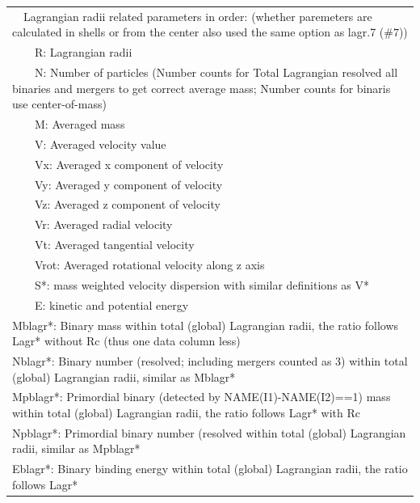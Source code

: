 \begin{longtable}{||p{0.42in}|p{0.25in}|p{0.6in}|p{0.6in}|p{0.4in}|p{2.3in}||}
\multicolumn{6}{|p{5.4in}|}{~~Lagrangian radii related parameters in order: (whether paremeters are calculated in shells or from the center also used the same option as lagr.7 ($\#7$))}\\
\multicolumn{6}{|p{5.4in}|}{~~~~R: Lagrangian radii}\\
\multicolumn{6}{|p{5.4in}|}{~~~~N: Number of particles (Number counts for Total Lagrangian resolved all binaries and mergers to get correct average mass; Number counts for binaris use center-of-mass)}\\
\multicolumn{6}{|p{5.4in}|}{~~~~M: Averaged mass }\\
\multicolumn{6}{|p{5.4in}|}{~~~~V: Averaged velocity value}\\
\multicolumn{6}{|p{5.4in}|}{~~~~Vx: Averaged x component of velocity}\\
\multicolumn{6}{|p{5.4in}|}{~~~~Vy: Averaged y component of velocity}\\
\multicolumn{6}{|p{5.4in}|}{~~~~Vz: Averaged z component of velocity}\\
\multicolumn{6}{|p{5.4in}|}{~~~~Vr: Averaged radial velocity}\\
\multicolumn{6}{|p{5.4in}|}{~~~~Vt: Averaged tangential velocity}\\
\multicolumn{6}{|p{5.4in}|}{~~~~Vrot: Averaged rotational velocity along z axis}\\
\multicolumn{6}{|p{5.4in}|}{~~~~S*: mass weighted velocity dispersion with similar definitions as V*}\\
\multicolumn{6}{|p{5.4in}|}{~~~~E: kinetic and potential energy}\\
\multicolumn{6}{|p{5.4in}|}{Mblagr*: Binary mass within total (global) Lagrangian radii, the ratio follows Lagr* without Rc (thus one data column less)}\\
\multicolumn{6}{|p{5.4in}|}{Nblagr*: Binary number (resolved; including mergers counted as 3) within total (global) Lagrangian radii, similar as Mblagr*}\\
\multicolumn{6}{|p{5.4in}|}{Mpblagr*: Primordial binary (detected by NAME(I1)-NAME(I2)==1) mass within total (global) Lagrangian radii, the ratio follows Lagr* with Rc}\\
\multicolumn{6}{|p{5.4in}|}{Npblagr*: Primordial binary number (resolved within total (global) Lagrangian radii, similar as Mpblagr*}\\
\multicolumn{6}{|p{5.4in}|}{Eblagr*: Binary binding energy within total (global) Lagrangian radii, the ratio follows Lagr*}\\

\end{longtable}
